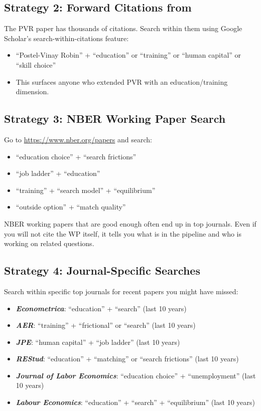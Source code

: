 \documentclass[12pt]{article}
\begin{document}
\subsection{Strategy 2: Forward Citations from \citet{postelvinary2002}}

The PVR paper has thousands of citations. Search within them using Google Scholar's search-within-citations feature:
\begin{itemize}
    \item ``Postel-Vinay Robin'' + ``education'' or ``training'' or ``human capital'' or ``skill choice''
    \item This surfaces anyone who extended PVR with an education/training dimension.
\end{itemize}

\subsection{Strategy 3: NBER Working Paper Search}

Go to \url{https://www.nber.org/papers} and search:
\begin{itemize}
    \item ``education choice'' + ``search frictions''
    \item ``job ladder'' + ``education''
    \item ``training'' + ``search model'' + ``equilibrium''
    \item ``outside option'' + ``match quality''
\end{itemize}
NBER working papers that are good enough often end up in top journals. Even if you will not cite the WP itself, it tells you what is in the pipeline and who is working on related questions.

\subsection{Strategy 4: Journal-Specific Searches}

Search within specific top journals for recent papers you might have missed:
\begin{itemize}
    \item \textbf{\emph{Econometrica}}: ``education'' + ``search'' (last 10 years)
    \item \textbf{\emph{AER}}: ``training'' + ``frictional'' or ``search'' (last 10 years)
    \item \textbf{\emph{JPE}}: ``human capital'' + ``job ladder'' (last 10 years)
    \item \textbf{\emph{REStud}}: ``education'' + ``matching'' or ``search frictions'' (last 10 years)
    \item \textbf{\emph{Journal of Labor Economics}}: ``education choice'' + ``unemployment'' (last 10 years)
    \item \textbf{\emph{Labour Economics}}: ``education'' + ``search'' + ``equilibrium'' (last 10 years)
\end{itemize}
\end{document}
